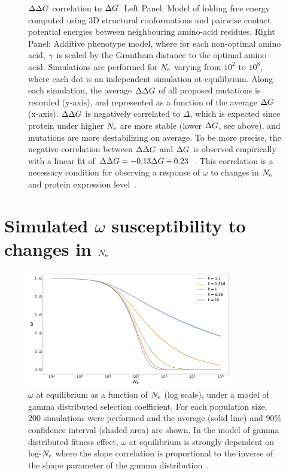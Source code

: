 \documentclass{article}
\begin{document}
\begin{figure}[H]
    \caption[$\EmpiricalDeltaDeltaG$ correlation to $\DeltaG$]{
    $\EmpiricalDeltaDeltaG$ correlation to $\DeltaG$.
    Left Panel: Model of folding free energy computed using 3D structural conformations and pairwise contact potential energies between neighbouring amino-acid residues.
    Right Panel: Additive {phenotype} model, where for each non-optimal amino acid, $\gamma$ is scaled by the Grantham distance to the optimal amino acid.
    Simulations are performed for $N_{\text{e}}$ varying from $10^2$ to $10^8$, where each dot is an independent simulation at equilibrium.
    Along each simulation, the average $\EmpiricalDeltaDeltaG$ of all proposed mutations is recorded (y-axis), and represented as a function of the average $\DeltaG$ (x-axis).
    $\EmpiricalDeltaDeltaG$ is negatively correlated to $\Delta$, which is expected since protein under higher $N_{\text{e}}$ are more stable (lower $\DeltaG$, see above), and mutations are more destabilizing on average.
    To be more precise, the negative correlation between $\EmpiricalDeltaDeltaG$ and $\DeltaG$ is observed empirically with a linear fit of $\Delta \Delta G = -0.13\Delta G + 0.23$~\citep{Serohijos2012}.
    This correlation is a necessary condition for observing a response of $\omega$ to changes in $N_{\text{e}}$~\citep{Goldstein2013} and protein expression level~\citep{Serohijos2012}.
    }
    \label{fig:DG-vs-DDG}
\end{figure}


\section{Simulated \texorpdfstring{$\omega$}{ω} susceptibility to changes in \texorpdfstring{$N_{\text{e}}$}{Nₑ}}
\label{sec:simulated-omega-susceptibility-to-changes-Ne}

\begin{figure}[H]
    \centering
    \includegraphics[width=0.8\textwidth] {SimuDfe-Elasticity.pdf}
    \caption[$\omega$ susceptibility with gamma distributed selection coefficient]{
    $\omega$ at equilibrium as a function of $N_{\text{e}}$ (log scale), under a model of gamma distributed selection coefficient.
    For each population size, $200$ simulations were performed and the average (solid line) and $90\%$ confidence interval (shaded area) are shown.
    In the model of gamma distributed fitness effect, $\omega$ at equilibrium is strongly dependent on log-$N_{\text{e}}$ where the slope correlation is proportional to the inverse of the shape parameter of the gamma distribution~\citep{Welch2008}.
    }
\end{figure}
\end{document}
